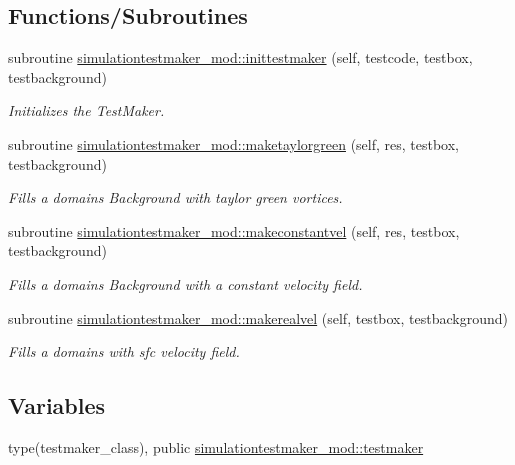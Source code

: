 \subsection*{Functions/\+Subroutines}
\begin{DoxyCompactItemize}
\item 
subroutine \mbox{\hyperlink{namespacesimulationtestmaker__mod_a4ad5df056a516e03a3d1c17f6d3046cf}{simulationtestmaker\+\_\+mod\+::inittestmaker}} (self, testcode, testbox, testbackground)
\begin{DoxyCompactList}\small\item\em Initializes the Test\+Maker. \end{DoxyCompactList}\item 
subroutine \mbox{\hyperlink{namespacesimulationtestmaker__mod_a45bbd32a561c88c18498d88f2d540cc4}{simulationtestmaker\+\_\+mod\+::maketaylorgreen}} (self, res, testbox, testbackground)
\begin{DoxyCompactList}\small\item\em Fills a domain\textquotesingle{}s Background with taylor green vortices. \end{DoxyCompactList}\item 
subroutine \mbox{\hyperlink{namespacesimulationtestmaker__mod_a59ecca693ee5dfe472e2694c9399f0f0}{simulationtestmaker\+\_\+mod\+::makeconstantvel}} (self, res, testbox, testbackground)
\begin{DoxyCompactList}\small\item\em Fills a domain\textquotesingle{}s Background with a constant velocity field. \end{DoxyCompactList}\item 
subroutine \mbox{\hyperlink{namespacesimulationtestmaker__mod_aefae35a08583d3983b922b33b8c74225}{simulationtestmaker\+\_\+mod\+::makerealvel}} (self, testbox, testbackground)
\begin{DoxyCompactList}\small\item\em Fills a domain\textquotesingle{}s with sfc velocity field. \end{DoxyCompactList}\end{DoxyCompactItemize}
\subsection*{Variables}
\begin{DoxyCompactItemize}
\item 
type(testmaker\+\_\+class), public \mbox{\hyperlink{namespacesimulationtestmaker__mod_a344a43a231fc0e61e77875fa7ec95b12}{simulationtestmaker\+\_\+mod\+::testmaker}}
\end{DoxyCompactItemize}
